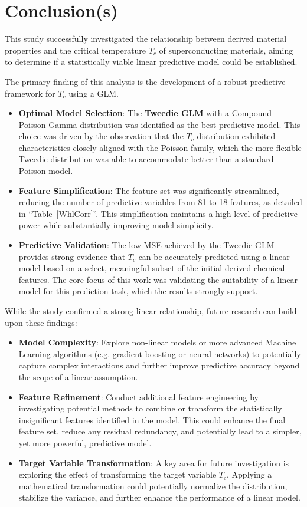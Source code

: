 \documentclass[conference]{IEEEtran}
\begin{document}
\section{\textbf{Conclusion(s)}}

This study successfully investigated the relationship between derived material properties and the critical temperature $T_c$ of superconducting materials, aiming to determine if a statistically viable linear predictive model could be established.

The primary finding of this analysis is the development of a robust predictive framework for $T_c$ using a GLM.
\begin{itemize}
	\item \textbf{Optimal Model Selection}: The \textbf{Tweedie GLM} with a Compound Poisson-Gamma distribution was identified as the best predictive model. This choice was driven by the observation that the $T_c$ distribution exhibited characteristics closely aligned with the Poisson family, which the more flexible Tweedie distribution was able to accommodate better than a standard Poisson model.
	\item \textbf{Feature Simplification}: The feature set was significantly streamlined, reducing the number of predictive variables from 81 to 18 features, as detailed in ``Table~\ref{WhlCorr}''. This simplification maintains a high level of predictive power while substantially improving model simplicity.
	\item \textbf{Predictive Validation}: The low MSE achieved by the Tweedie GLM provides strong evidence that $T_c$ can be accurately predicted using a linear model based on a select, meaningful subset of the initial derived chemical features. The core focus of this work was validating the suitability of a linear model for this prediction task, which the results strongly support.\\
\end{itemize}

While the study confirmed a strong linear relationship, future research can build upon these findings:
\begin{itemize}
	\item \textbf{Model Complexity}: Explore non-linear models or more advanced Machine Learning algorithms (e.g. gradient boosting or neural networks) to potentially capture complex interactions and further improve predictive accuracy beyond the scope of a linear assumption.
	\item \textbf{Feature Refinement}: Conduct additional feature engineering by investigating potential methods to combine or transform the statistically insignificant features identified in the model. This could enhance the final feature set, reduce any residual redundancy, and potentially lead to a simpler, yet more powerful, predictive model.
	\item \textbf{Target Variable Transformation}: A key area for future investigation is exploring the effect of transforming the target variable $T_c$. Applying a mathematical transformation could potentially normalize the distribution, stabilize the variance, and further enhance the performance of a linear model.
\end{itemize}
\end{document}
